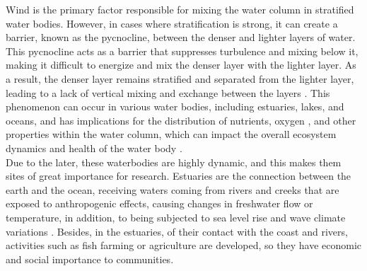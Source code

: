 \documentclass[tesis.tex]{subfiles}
\begin{document}
Wind is the primary factor responsible for mixing the water column in stratified water bodies. However, in cases where stratification is strong, it can create a barrier, known as the pycnocline, between the denser and lighter layers of water. This pycnocline acts as a barrier that suppresses turbulence and mixing below it, making it difficult to energize and mix the denser layer with the lighter layer. As a result, the denser layer remains stratified and separated from the lighter layer, leading to a lack of vertical mixing and exchange between the layers \citep{Cousins2010}. This phenomenon can occur in various water bodies, including estuaries, lakes, and oceans, and has implications for the distribution of nutrients, oxygen \citep{Kelly2018}, and other properties within the water column, which can impact the overall ecosystem dynamics and health of the water body \citep{marti2008relating}.\\  

Due to the later, these waterbodies are highly dynamic, and this makes them sites of great importance for research. Estuaries are the connection between the earth and the ocean, receiving waters coming from rivers and creeks that are exposed to anthropogenic effects, causing changes in freshwater flow or temperature, in addition, to being subjected to sea level rise and wave climate variations \citep{grez2020evidence, holt2010potential, thorne2021wetlands}. Besides, in the estuaries, of their contact with the coast and rivers, activities such as fish farming or agriculture are developed, so they have economic and social importance to communities. \\
\end{document}
